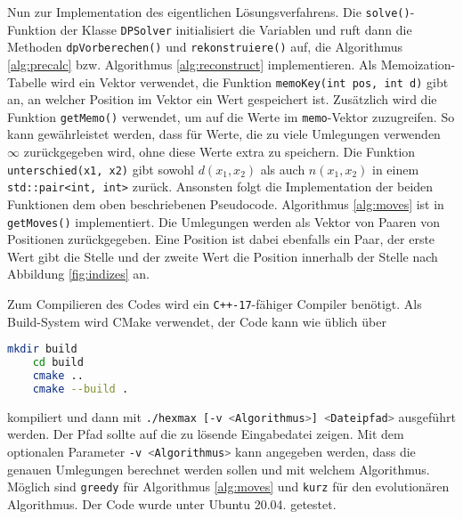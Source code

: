 \documentclass[a4paper,10pt,ngerman]{scrartcl}
\begin{document}
Nun zur Implementation des eigentlichen Lösungsverfahrens. 
Die \lstinline{solve()}-Funktion  der Klasse \lstinline{DPSolver} initialisiert die Variablen und ruft dann die Methoden \lstinline{dpVorberechen()} und \lstinline{rekonstruiere()}  auf, die Algorithmus \ref{alg:precalc} bzw. Algorithmus \ref{alg:reconstruct} implementieren.
Als Memoization-Tabelle wird ein Vektor verwendet, die Funktion \lstinline{memoKey(int pos, int d)} gibt an, an welcher Position im Vektor ein Wert gespeichert ist. 
Zusätzlich wird die Funktion \lstinline{getMemo()} verwendet, um auf die Werte im \lstinline{memo}-Vektor zuzugreifen. 
So kann gewährleistet werden, dass für Werte, die zu viele Umlegungen verwenden $\infty$ zurückgegeben wird, ohne diese Werte extra zu speichern. 
Die Funktion \lstinline{unterschied(x1, x2)} gibt sowohl $d(x_1, x_2)$ als auch $n(x_1, x_2)$ in einem \lstinline{std::pair<int, int>} zurück. 
Ansonsten folgt die Implementation der beiden Funktionen dem oben beschriebenen Pseudocode. 
Algorithmus \ref{alg:moves} ist in \lstinline{getMoves()} implementiert. 
Die Umlegungen werden als Vektor von Paaren von Positionen zurückgegeben.
Eine Position ist dabei ebenfalls ein Paar, der erste Wert gibt die Stelle und der zweite Wert die Position innerhalb der Stelle nach Abbildung \ref{fig:indizes} an.

Zum Compilieren des Codes wird ein \texttt{C++-17}-fähiger Compiler benötigt.
Als Build-System wird CMake verwendet, der Code kann wie üblich über 
\begin{lstlisting}[language=bash]
    mkdir build
    cd build
    cmake ..
    cmake --build . 
\end{lstlisting}    
kompiliert und dann mit \lstinline[language=bash]{./hexmax [-v <Algorithmus>] <Dateipfad>} ausgeführt werden. Der Pfad sollte auf die zu lösende Eingabedatei zeigen. Mit dem optionalen Parameter \lstinline[language=bash]{-v <Algorithmus>} kann angegeben werden, dass die genauen Umlegungen berechnet werden sollen und mit welchem Algorithmus. Möglich sind \lstinline[language=bash]{greedy} für Algorithmus \ref{alg:moves} und \lstinline[language=bash]{kurz} für den evolutionären Algorithmus. Der Code wurde unter Ubuntu 20.04. getestet. 
\end{document}
